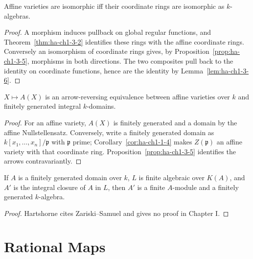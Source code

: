 \begin{corollary}
\label{cor:ha-ch1-3-7}
Affine varieties are isomorphic iff their coordinate rings are isomorphic as $k$-algebras.
\end{corollary}
\begin{proof}
A morphism induces pullback on global regular functions, and Theorem~\ref{thm:ha-ch1-3-2} identifies
these rings with the affine coordinate rings.  Conversely an isomorphism of coordinate rings gives,
by Proposition~\ref{prop:ha-ch1-3-5}, morphisms in both directions.  The two composites pull back to
the identity on coordinate functions, hence are the identity by Lemma~\ref{lem:ha-ch1-3-6}.
\end{proof}

\begin{corollary}
\label{cor:ha-ch1-3-8}
$X\mapsto A(X)$ is an arrow-reversing equivalence between affine varieties over $k$ and finitely
generated integral $k$-domains.
\end{corollary}
\begin{proof}
For an affine variety, $A(X)$ is finitely generated and a domain by the affine Nullstellensatz.
Conversely, write a finitely generated domain as $k[x_1,\ldots,x_n]/\mathfrak p$ with $\mathfrak p$
prime; Corollary~\ref{cor:ha-ch1-1-4} makes $Z(\mathfrak p)$ an affine variety with that coordinate
ring.  Proposition~\ref{prop:ha-ch1-3-5} identifies the arrows contravariantly.
\end{proof}

\begin{theorem}
\label{thm:ha-ch1-3-9A}
If $A$ is a finitely generated domain over $k$, $L$ is finite algebraic over $K(A)$, and $A'$ is
the integral closure of $A$ in $L$, then $A'$ is a finite $A$-module and a finitely generated
$k$-algebra.
\end{theorem}
\begin{proof}
Hartshorne cites Zariski--Samuel and gives no proof in Chapter I.
\end{proof}

\section{Rational Maps}


